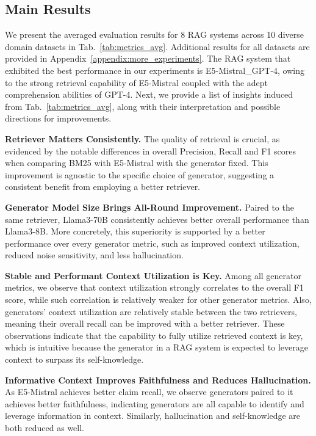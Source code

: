 \subsection{Main Results}
\label{sec:analysis}

We present the averaged evaluation results for 8 RAG systems across 10 diverse domain datasets in Tab.~\ref{tab:metrics_avg}. Additional results for all datasets are provided in Appendix~\ref{appendix:more_experiments}. The RAG system that exhibited the best performance in our experiments is E5-Mistral\_GPT-4, owing to the strong retrieval capability of E5-Mistral coupled with the adept comprehension abilities of GPT-4. Next, we provide a list of insights induced from Tab.~\ref{tab:metrics_avg}, along with their interpretation and possible directions for improvements.


\textbf{Retriever Matters Consistently.} The quality of retrieval is crucial, as evidenced by the notable differences in overall  Precision, Recall and F1 scores when comparing BM25 with E5-Mistral with the generator fixed. This improvement is agnostic to the specific choice of generator, suggesting a consistent benefit from employing a better retriever.

\textbf{Generator Model Size Brings All-Round Improvement.} Paired to the same retriever, Llama3-70B consistently achieves better overall performance than Llama3-8B. More concretely, this superiority is supported by a better performance over every generator metric, such as improved context utilization, reduced noise sensitivity, and less hallucination.

\textbf{Stable and Performant Context Utilization is Key.} Among all generator metrics, we observe that context utilization strongly correlates to the overall F1 score, while such correlation is relatively weaker for other generator metrics. Also, generators' context utilization are relatively stable between the two retrievers, meaning their overall recall can be improved with a better retriever.
% 
These observations indicate that the capability to fully utilize retrieved context is key, which is intuitive because the generator in a RAG system is expected to leverage context to surpass its self-knowledge.

\textbf{Informative Context Improves Faithfulness and Reduces Hallucination.} As E5-Mistral achieves better claim recall, we observe generators paired to it achieves better faithfulness, indicating generators are all capable to identify and leverage information in context. Similarly, hallucination and self-knowledge are both reduced as well. 


